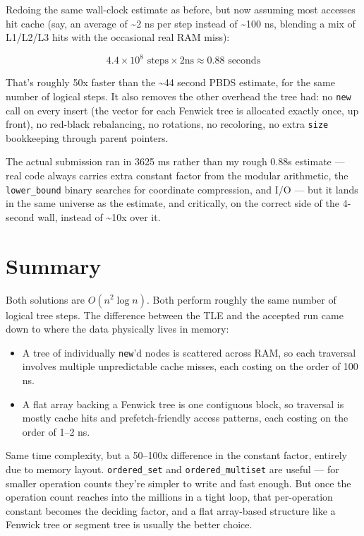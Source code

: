 \documentclass[11pt,a4paper]{article}
\begin{document}
Redoing the same wall-clock estimate as before, but now assuming most accesses hit cache (say, an average of \textasciitilde{}2 ns per step instead of \textasciitilde{}100 ns, blending a mix of L1/L2/L3 hits with the occasional real RAM miss):


\[
4.4 \times 10^8 \text{ steps} \times 2\text{ns} \approx 0.88 \text{ seconds}
\]


That's roughly 50x faster than the \textasciitilde{}44 second PBDS estimate, for the same number of logical steps. It also removes the other overhead the tree had: no \texttt{new} call on every insert (the vector for each Fenwick tree is allocated exactly once, up front), no red-black rebalancing, no rotations, no recoloring, no extra \texttt{size} bookkeeping through parent pointers.

The actual submission ran in 3625 ms rather than my rough 0.88s estimate --- real code always carries extra constant factor from the modular arithmetic, the \texttt{lower\_bound} binary searches for coordinate compression, and I/O --- but it lands in the same universe as the estimate, and critically, on the correct side of the 4-second wall, instead of \textasciitilde{}10x over it.

\section{Summary}

Both solutions are $O(n^2 \log n)$. Both perform roughly the same number of logical tree steps. The difference between the TLE and the accepted run came down to where the data physically lives in memory:

\begin{itemize}
\item A tree of individually \texttt{new}'d nodes is scattered across RAM, so each traversal involves multiple unpredictable cache misses, each costing on the order of 100 ns.
\item A flat array backing a Fenwick tree is one contiguous block, so traversal is mostly cache hits and prefetch-friendly access patterns, each costing on the order of 1--2 ns.
\end{itemize}

Same time complexity, but a 50--100x difference in the constant factor, entirely due to memory layout. \texttt{ordered\_set} and \texttt{ordered\_multiset} are useful --- for smaller operation counts they're simpler to write and fast enough. But once the operation count reaches into the millions in a tight loop, that per-operation constant becomes the deciding factor, and a flat array-based structure like a Fenwick tree or segment tree is usually the better choice.
\end{document}
